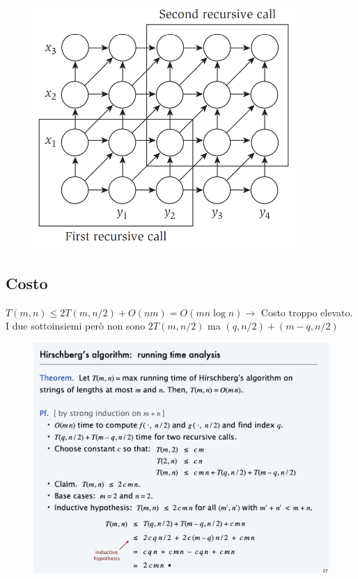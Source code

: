 \begin{figure}[H]
	\centering
	\includegraphics[width=10cm, keepaspectratio]{capitoli/programmazione_dinamica/imgs/seq_align_recurrence.png}
\end{figure}

\subsection{Costo}

$T(m,n) \le 2T(m, n/2) + O(nm) = O(mn \log n) \rightarrow$ Costo
troppo elevato.\\ I due sottoinsiemi però non sono $2T(m, n/2)$ ma
$(q, n/2) + (m-q, n/2)$

\begin{figure}[H]
	\centering
	\includegraphics[width=12cm, keepaspectratio]{capitoli/programmazione_dinamica/imgs/hirschberg.png}
\end{figure}


